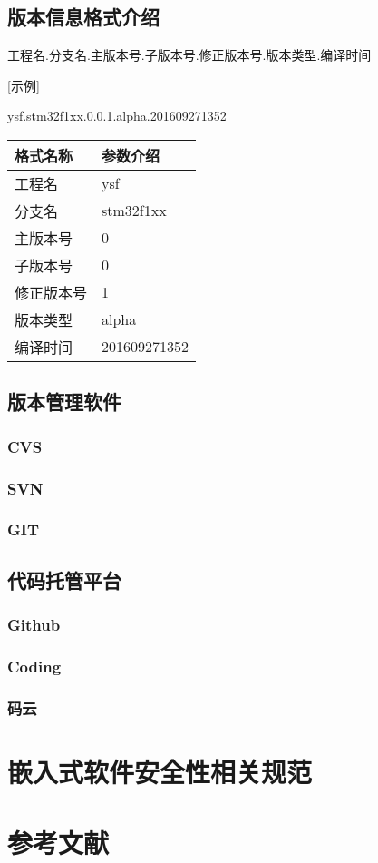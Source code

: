 \documentclass[UTF8,a4paper,12pt]{article}
\begin{document}
	\subsection{版本信息格式介绍}
	\begin{center}
	工程名.分支名.主版本号.子版本号.修正版本号.版本类型.编译时间\\
	\end{center}
 
	[示例]
	\begin{center}
	ysf.stm32f1xx.0.0.1.alpha.201609271352
	\end{center}

	\begin{center}
		\begin{tabular}{|p{5cm}|p{5cm}|}  
			\hline
			格式名称 & 参数介绍 \\ \hline
			工程名 & ysf \\ \hline
			分支名 & stm32f1xx \\ \hline
			主版本号 & 0 \\ \hline
			子版本号 & 0 \\ \hline
			修正版本号 & 1 \\ \hline
			版本类型 & alpha \\ \hline
			编译时间 & 201609271352 \\ \hline
		\end{tabular}
	\end{center}

	\subsection{版本管理软件}
	\subsubsection{CVS}
	\subsubsection{SVN}
	\subsubsection{GIT}
	\subsection{代码托管平台}
	\subsubsection{Github}
	\subsubsection{Coding}
	\subsubsection{码云}
	\newpage
	
	\section{嵌入式软件安全性相关规范}
	\newpage
	
	\section{参考文献}
	\newpage
\end{document}
